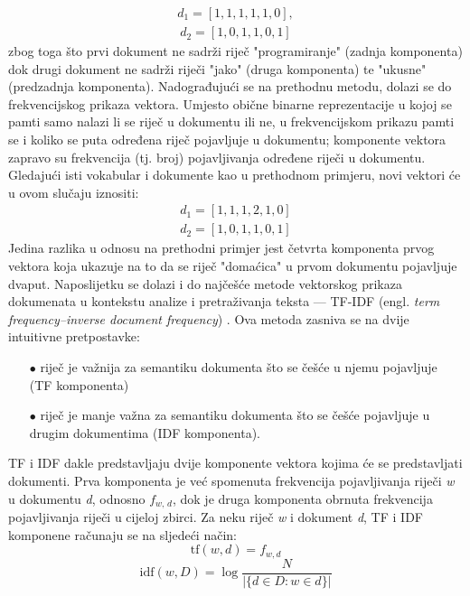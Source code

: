 \documentclass[times, utf8, zavrsni, numeric]{fer}
\begin{document}
\begin{align*}
{{d_{1}}=[1, 1, 1, 1, 1, 0]},
\end{align*}
\begin{align*}
{{d_{2}}=[1, 0, 1, 1, 0, 1]}
\end{align*}
zbog toga što prvi dokument ne sadrži riječ "programiranje" (zadnja komponenta) dok drugi dokument ne sadrži riječi "jako" (druga komponenta) te "ukusne" (predzadnja komponenta).
Nadograđujući se na prethodnu metodu, dolazi se do frekvencijskog prikaza vektora. Umjesto obične binarne reprezentacije u kojoj se pamti samo nalazi li se riječ u dokumentu ili ne, u frekvencijskom prikazu pamti se i koliko se puta određena riječ pojavljuje u dokumentu; komponente vektora zapravo su frekvencija (tj. broj) pojavljivanja određene riječi u dokumentu. Gledajući isti vokabular i dokumente kao u prethodnom primjeru, novi vektori će u ovom slučaju iznositi:
\begin{align*}
{{d_{1}}=[1, 1, 1, 2, 1, 0]}
\end{align*}
\begin{align*}
{{d_{2}}=[1, 0, 1, 1, 0, 1]}
\end{align*}
Jedina razlika u odnosu na prethodni primjer jest četvrta komponenta prvog vektora koja ukazuje na to da se riječ "domaćica" u prvom dokumentu pojavljuje dvaput.
Naposlijetku se dolazi i do najčešće metode vektorskog prikaza dokumenata u kontekstu analize i pretraživanja teksta — TF-IDF (engl. \textit{term frequency–inverse document frequency}) \cite{Stole2017}. Ova metoda zasniva se na dvije intuitivne pretpostavke:
\begin{itemize}
\item[$\bullet$] riječ je važnija za semantiku dokumenta što se češće u njemu pojavljuje (TF komponenta)
\item[$\bullet$] riječ je manje važna za semantiku dokumenta što se češće pojavljuje u drugim dokumentima (IDF komponenta).
\end{itemize}
TF i IDF dakle predstavljaju dvije komponente vektora kojima će se predstavljati dokumenti. Prva komponenta je već spomenuta frekvencija pojavljivanja riječi \textit{w} u dokumentu \textit{d}, odnosno $f_\textit{w, d}$, dok je druga komponenta obrnuta frekvencija pojavljivanja riječi u cijeloj zbirci.
Za neku riječ \textit{w} i dokument \textit{d}, TF i IDF komponene računaju se na sljedeći način:
\begin{equation}
{\displaystyle \mathrm {tf} (w,d)=f_{w,d}}
\end{equation}
\begin{equation}
{\displaystyle \mathrm {idf} (w,D)=\log {\frac {N}{|\{d\in D:w\in d\}|}}}
\label{eq:idf}
\end{equation}
\end{document}
